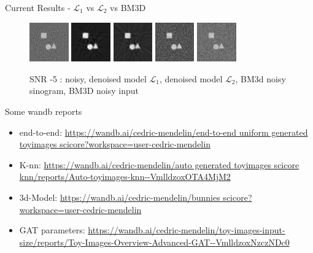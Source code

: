 \documentclass[aspectratio=169]{beamer}
\begin{document}
\begin{frame}{Current Results - $\mathcal{L}_1$ vs $\mathcal{L}_2$ vs BM3D }

    \begin{figure}
        \includegraphics[width=0.15\textwidth]{noisy_fbp_n5}
        \includegraphics[width=0.15\textwidth]{denoised_fbp_n5}
        \includegraphics[width=0.15\textwidth]{denoised_ete_fbp_n5}
        \includegraphics[width=0.15\textwidth]{bm3d_noisy_sino}
        \includegraphics[width=0.15\textwidth]{bm3d_noisy_input}
        
        \caption{SNR -5 : noisy, denoised model $\mathcal{L}_1$, denoised model $\mathcal{L}_2$, BM3d noisy sinogram, BM3D noisy input}
    \end{figure}
    
\end{frame}

\begin{frame}{Some wandb reports}
    \begin{itemize}
        \item end-to-end: \url{https://wandb.ai/cedric-mendelin/end-to-end uniform generated toyimages scicore?workspace=user-cedric-mendelin}
        \item K-nn: \url{https://wandb.ai/cedric-mendelin/auto generated toyimages scicore knn/reports/Auto-toyimages-knn--VmlldzoxOTA4MjM2}
        \item 3d-Model: \url{https://wandb.ai/cedric-mendelin/bunnies scicore?workspace=user-cedric-mendelin}
        \item GAT parameters: \url{https://wandb.ai/cedric-mendelin/toy-images-input-size/reports/Toy-Images-Overview-Advanced-GAT--VmlldzoxNzczNDc0}
    \end{itemize}
    
    

\end{frame}
\end{document}
